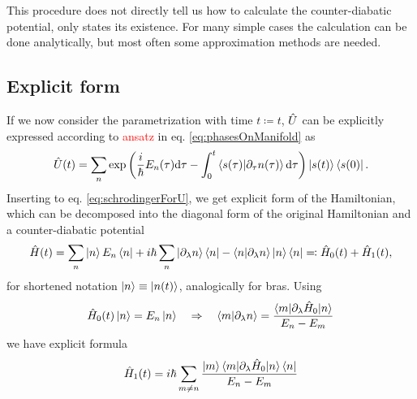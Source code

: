 This procedure does not directly tell us how to calculate the counter-diabatic potential, only states its existence. For many simple cases the calculation can be done analytically, but most often some approximation methods are needed.


\subsection{Explicit form}
If we now consider the parametrization with time $t\coloneqq t$, $\hat{U}$ can be explicitly expressed according to \textcolor{red}{ansatz} in eq. \ref{eq:phasesOnManifold} as
\begin{equation}
    \hat{U}(t)=\sum_n \exp\left(\frac{i}{\hbar}E_n(\tau)\mathrm{d} \tau - \int_0^t \braket{s(\tau)|\partial_\tau n(\tau)}\mathrm{d}\tau\right)\ket{s(t)}\bra{s(0)}.
    \label{eq:evolutionUduringTransition}
\end{equation}
Inserting to eq. \ref{eq:schrodingerForU}, we get explicit form of the Hamiltonian, which can be decomposed into the diagonal form of the original Hamiltonian and a counter-diabatic potential
\begin{equation}
    \hat{H}(t)=\sum_n \ket{n}E_n\bra{n}+ i\hbar \sum_n\ket{\partial_\lambda n}\bra{n}-\braket{n|\partial_\lambda n}\ket{n}\bra{n}\eqqcolon \hat{H}_0(t)+\hat{H}_1(t),
\end{equation}
for shortened notation $\ket{n}\equiv \ket{n(t)}$, analogically for bras. Using
\begin{equation}
    \hat{H}_0(t)\ket{n}=E_n\ket{n}\quad \Rightarrow\quad \braket{m|\partial_\lambda n}=\frac{\braket{m|\partial_\lambda\hat{H}_0| n}}{E_n-E_m}
\end{equation}
we have explicit formula
\begin{equation}
    \hat{H}_1(t)= i\hbar \sum_{m\neq n}\frac{\ket{m}\braket{m|\partial_\lambda\hat{H}_0| n}\bra{n}}{E_n-E_m}
    \label{eq:explicitCounterDiabaticPotential}
\end{equation}



